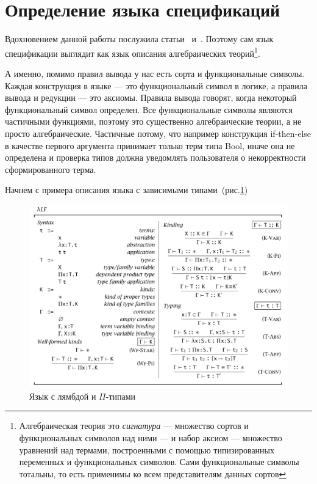 \section{Определение языка спецификаций}\label{lang_spec}



Вдохновением данной работы послужила статьи~\cite{Palmgren} и~\cite{isaev}. Поэтому сам язык спецификации выглядит как язык описания алгебраических теорий\footnote{Алгебраическая теория это \textit{сигнатура} --- множество сортов и функциональных символов над ними --- и набор аксиом --- множество уравнений над термами, построенными с помощью типизированных переменных и функциональных символов. Сами функциональные символы тотальны, то есть применимы ко всем представителям данных сортов}.

А именно, помимо правил вывода у нас есть сорта и функциональные символы. Каждая конструкция в языке --- это функциональный символ в логике, а правила вывода и редукции --- это аксиомы. Правила вывода говорят, когда некоторый функциональный символ определен. Все функциональные символы являются частичными функциями, поэтому это существенно алгебраические теории, а не просто алгебраические. Частичные потому, что например конструкция if-then-else в качестве первого аргумента принимает только терм типа Bool, иначе она не определена и проверка типов должна уведомлять пользователя о некорректности сформированного терма.

Начнем с примера описания языка с зависимыми типами~(рис.\ref{lpi})~\cite[Глава~2.1]{book:pierce}

\begin{figure}
    \centering
	\includegraphics[scale=0.35]{img/lp.png}
	\caption{Язык с лямбдой и $\Pi$-типами }
	\label{lpi}
\end{figure}

